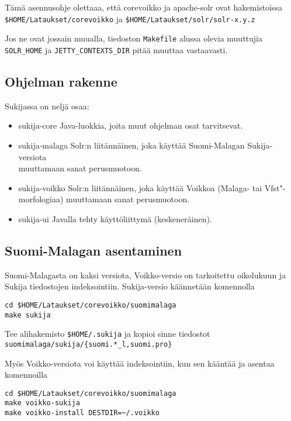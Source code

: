 \documentclass[12pt,a4paper]{scrartcl}
\begin{document}
Tämä asennusohje olettaaa, että corevoikko ja apache-solr ovat hakemistoissa \\
\verb=$HOME/Lataukset/corevoikko= ja
\verb=$HOME/Lataukset/solr/solr-x.y.z=

Jos ne ovat jossain muualla, tiedoston \verb=Makefile= alussa olevia
muuttujia \verb=SOLR_HOME= ja \verb=JETTY_CONTEXTS_DIR= pitää muuttaa
vastaavasti.

\newpage
\subsection*{Ohjelman rakenne}

Sukijassa on neljä osaa:

\begin{itemize}
\item sukija-core     Java-luokkia, joita muut ohjelman osat tarvitsevat.
\item sukija-malaga   Solr:n liitännäinen, joka käyttää Suomi-Malagan
                      Sukija-versiota \\muuttamaan sanat perusmuotoon.
\item sukija-voikko   Solr:n liitännäinen, joka käyttää Voikkoa
                      (Malaga- tai Vfst"-morfologiaa) muuttamaan sanat perusmuotoon.
\item sukija-ui       Javalla tehty käyttöliittymä (keskeneräinen).
\end{itemize}


\subsection*{Suomi-Malagan asentaminen}

Suomi-Malagasta on kaksi versiota, Voikko-versio on tarkoitettu
oikolukuun ja Sukija tiedostojen indeksointiin. Sukija-versio
käännetään komennolla

\begin{verbatim}
cd $HOME/Lataukset/corevoikko/suomimalaga
make sukija
\end{verbatim}

Tee alihakemisto \verb=$HOME/.sukija= ja kopioi sinne tiedostot \\
\verb=suomimalaga/sukija/{suomi.*_l,suomi.pro}=

Myös Voikko-versiota voi käyttää indeksointiin, kun sen kääntää ja
asentaa komennoilla

\begin{verbatim}
cd $HOME/Lataukset/corevoikko/suomimalaga
make voikko-sukija
make voikko-install DESTDIR=~/.voikko
\end{verbatim}
\end{document}
